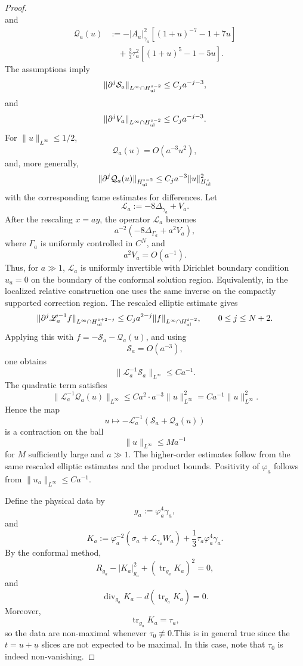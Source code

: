 \documentclass{amsart}
\newcommand{\ubar}{\underline{u}}
\begin{document}
{\begin{proof}
\[\] and \[ \begin{aligned} \mathcal Q_a(u) &:= -|A_a|_{\gamma_a}^2 \left[ (1+u)^{-7}-1+7u \right] \\ &\quad + \frac23\tau_a^2 \left[ (1+u)^5-1-5u \right]. \end{aligned} \] The assumptions imply \[ \|\partial^j\mathcal S_a\|_{L^\infty\cap H^{s-2}_{\rm ul}} \le C_j a^{-j-3}, \] and \[ \|\partial^jV_a\|_{L^\infty\cap H^{s-2}_{\rm ul}} \le C_j a^{-j-3}. \] For \(\|u\|_{L^\infty}\le 1/2\), \[ \mathcal Q_a(u)=O(a^{-3}u^2), \] and, more generally, \[ \|\partial^j\mathcal Q_a(u)\|_{H^{s-2}_{\rm ul}} \le C_j a^{-3} \|u\|_{H^s_{\rm ul}}^2 \] with the corresponding tame estimates for differences. Let \[ \mathscr L_a:=-8\Delta_{\gamma_a}+V_a. \] After the rescaling \(x=ay\), the operator \(\mathscr L_a\) becomes \[ a^{-2}\left(-8\Delta_{\Gamma_a}+a^2V_a\right), \] where \(\Gamma_a\) is uniformly controlled in \(C^N\), and \[ a^2V_a=O(a^{-1}). \] Thus, for \(a\gg1\), \(\mathscr L_a\) is uniformly invertible with Dirichlet boundary condition \(u_a=0\) on the boundary of the conformal solution region. Equivalently, in the localized relative construction one uses the same inverse on the compactly supported correction region. The rescaled elliptic estimate gives \[ \|\partial^j\mathscr L_a^{-1}f\|_{L^\infty\cap H^{s+2-j}_{\rm ul}} \le C_j a^{2-j} \|f\|_{L^\infty\cap H^{s-2}_{\rm ul}}, \qquad 0\le j\le N+2. \] Applying this with \(f=-\mathcal S_a-\mathcal Q_a(u)\), and using \[ \mathcal S_a=O(a^{-3}), \] one obtains \[ \|\mathscr L_a^{-1}\mathcal S_a\|_{L^\infty} \le Ca^{-1}. \] The quadratic term satisfies \[ \|\mathscr L_a^{-1}\mathcal Q_a(u)\|_{L^\infty} \le C a^2\cdot a^{-3}\|u\|_{L^\infty}^2 = C a^{-1}\|u\|_{L^\infty}^2. \] Hence the map \[ u\longmapsto -\mathscr L_a^{-1}\left(\mathcal S_a+\mathcal Q_a(u)\right) \] is a contraction on the ball \[ \|u\|_{L^\infty}\le M a^{-1} \] for \(M\) sufficiently large and \(a\gg1\). The higher-order estimates follow from the same rescaled elliptic estimates and the product bounds. Positivity of $\varphi_{a}$ follows from \(\|u_a\|_{L^\infty}\le Ca^{-1}\).

\noindent Define the physical data by
\[
        g_a:=\varphi_a^4\gamma_a,
\]
and
\[
        K_a
        :=
        \varphi_a^{-2}
        \left(
        \sigma_a+\mathcal L_{\gamma_a}W_a
        \right)
        +
        \frac13\tau_a\varphi_a^4\gamma_a.
\]
By the conformal method,
\[
        R_{g_a}-|K_a|_{g_a}^2+(\operatorname{tr}_{g_a}K_a)^2=0,
\]
and
\[
        \operatorname{div}_{g_a}K_a-d(\operatorname{tr}_{g_a}K_a)=0.
\]
Moreover,
\[
        \operatorname{tr}_{g_a}K_a=\tau_a,
\]
so the data are non-maximal whenever \(\tau_0\not\equiv0\).This is in general true since the $t=u+\ubar$ slices are not expected to be maximal. In this case, note that $\tau_{0}$ is indeed non-vanishing. 



\end{proof}}
\end{document}
